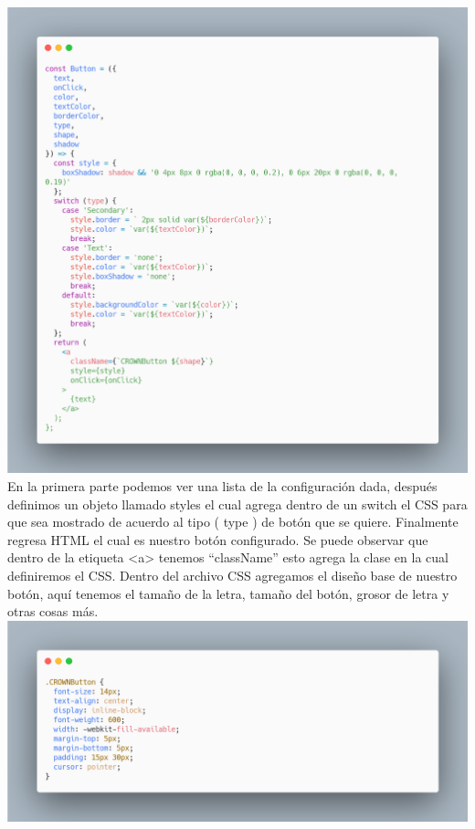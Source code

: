\newline
\includegraphics[width=1\textwidth]{./Imagenes/carbon-9.png}
\newline
\newline
En la primera parte podemos ver una lista de la configuración dada,  después definimos un objeto llamado styles el cual agrega dentro de un switch el CSS para que sea mostrado de acuerdo al tipo ( type ) de botón que se quiere. Finalmente regresa HTML el cual es nuestro botón configurado.
Se puede observar que dentro de la etiqueta <a> tenemos “className” esto agrega la clase en la cual definiremos el CSS.
Dentro del archivo CSS agregamos el diseño base de nuestro botón, aquí tenemos el  tamaño de la letra, tamaño del botón, grosor de letra y otras cosas más.
\newline
\newline
\includegraphics[width=1\textwidth]{./Imagenes/image26.png}
\newline
\newline



